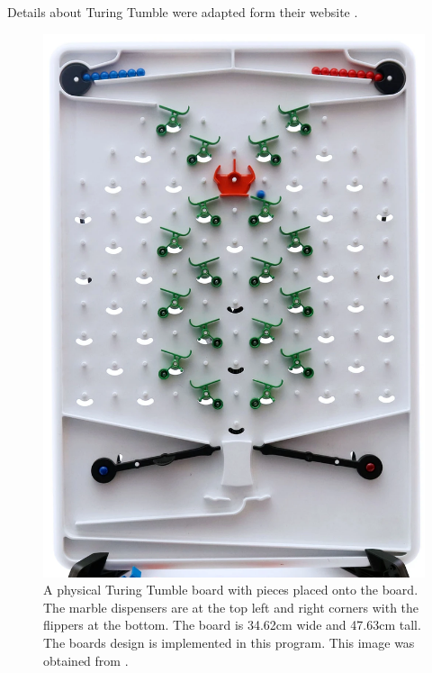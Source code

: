 \documentclass{l4proj}
\begin{document}
Details about Turing Tumble were adapted form their website \citep{turing_tumble_site}.

\begin{figure}
    \centering
    \includegraphics[width=0.6\linewidth]{images/turingTumbleBoard.png}
    \caption{A physical Turing Tumble board with pieces placed onto the board. The marble dispensers are at the top left and right corners with the flippers at the bottom. The board is 34.62cm wide and 47.63cm tall. The boards design is implemented in this program. This image was obtained from \cite{turing_tumble_picture}.}
    \label{fig:ttboard}
\end{figure}
\end{document}
